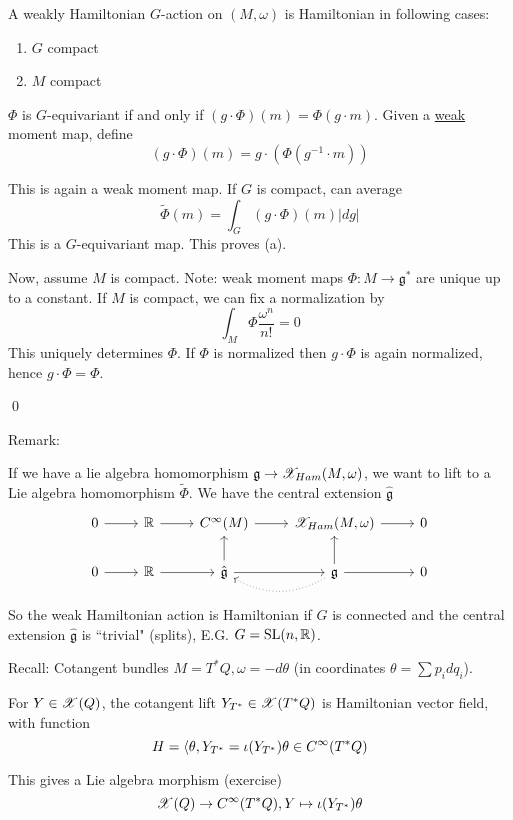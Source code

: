 \documentclass[x11names,reqno,14pt]{extarticle}
\newcommand{\mk}[1]{\mathfrak{#1}}
\newcommand{\g}{\mk{g}}
\begin{document}
A weakly Hamiltonian $G$-action on $(M,\omega)$ is Hamiltonian in following cases:
\begin{enumerate}[label=(\alph*)]

\item $G$ compact

\item $M$ compact

\end{enumerate}

\proof

$\Phi$ is $G$-equivariant if and only if $(g\cdot\Phi)(m) = \Phi(g\cdot m)$. Given a \underline{weak} moment map, define
\[
(g\cdot\Phi)(m) = g\cdot(\Phi(g^{-1}\cdot m))
\]

This is again a weak moment map. If $G$ is compact, can average 
\[
\tilde{\Phi}(m) = \int_G(g\cdot\Phi)(m)|dg|
\]
This is a $G$-equivariant map. This proves (a).

Now, assume $M$ is compact. Note: weak moment maps $\Phi:M\to\g^*$ are unique up to a constant. If $M$ is compact, we can fix a normalization by 
\[
\int_M\Phi\frac{\omega^n}{n!} = 0
\]
This uniquely determines $\Phi$. If $\Phi$ is normalized then $g\cdot\Phi$ is again normalized, hence $g\cdot\Phi=\Phi$.

\qed

Remark: 

If we have a lie algebra homomorphism $\g\to \ms{X}_{Ham}(M,\omega)$, we want to lift to a Lie algebra homomorphism $\tilde{\Phi}.$ We have the central extension $\hat{\g}$
\[
\begin{tikzcd}
0 \ar[r] & \R \ar[r] & C^\oo(M) \ar[r] & \ms{X}_{Ham}(M,\omega) \ar[r] & 0 \\
0 \ar[r] & \R \ar[r] & \hat{\g} \ar[u]\ar[r] & \ar[l,bend left = 30, dotted] \g\ar[u] \ar[r] & 0 
\end{tikzcd}
\]
So the weak Hamiltonian action is Hamiltonian if $G$ is connected and the central extension $\hat{\g}$ is ``trivial" (splits), E.G. $G = {\mathrm{SL}}(n,\mathbb{R})$.

\exm

Recall: Cotangent bundles $M = T^*Q, \omega = -d\theta$ (in coordinates $\theta = \sum p_idq_i$). 

For $Y \in \mathscr{X}(Q)$, the cotangent lift $Y_{T^*}\in\mathscr{X}(T^*Q)$ is Hamiltonian vector field, with function 
\[
H = \langle \theta, Y_{T^*} = \iota(Y_{T^*})\theta \in C^\infty(T^*Q)
\]

This gives a Lie algebra morphism (exercise)
\[
\mathscr{X}(Q) \to C^\infty(T^*Q), Y \mapsto \iota(Y_{T^*})\theta
\]
\end{document}

